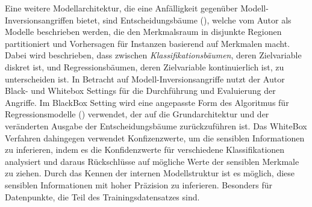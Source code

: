 Eine weitere Modellarchitektur, die eine Anfälligkeit gegenüber Modell-Inversionsangriffen bietet, sind Entscheidungsbäume (\cite[S. 4 ff.]{fredrikson_model_2015}), welche vom Autor als Modelle beschrieben werden, die den Merkmalsraum in disjunkte Regionen partitioniert und Vorhersagen für Instanzen basierend auf Merkmalen macht. Dabei wird beschrieben, dass zwischen \textit{Klassifikationsbäumen}, deren Zielvariable diskret ist, und Regressionsbäumen, deren Zielvariable kontinuierlich ist, zu unterscheiden ist. In Betracht auf Modell-Inversionsangriffe nutzt der Autor Black- und Whitebox Settings für die Durchführung und Evaluierung der Angriffe. Im BlackBox Setting wird eine angepasste Form des Algoritmus für Regressionsmodelle (\cite[21]{fredrikson_privacy_2014}) verwendet, der auf die Grundarchitektur und der veränderten Ausgabe der Entscheidungsbäume zurückzuführen ist. Das WhiteBox Verfahren dahingegen verwendet Konfizenzwerte, um die sensiblen Informationen zu inferieren, indem es die Konfidenzwerte für verschiedene Klassifikationen analysiert und daraus Rückschlüsse auf mögliche Werte der sensiblen Merkmale zu ziehen. Durch das Kennen der internen Modellstruktur ist es möglich, diese sensiblen Informationen mit hoher Präzision zu inferieren. Besonders für Datenpunkte, die Teil des Trainingsdatensatzes sind. 


